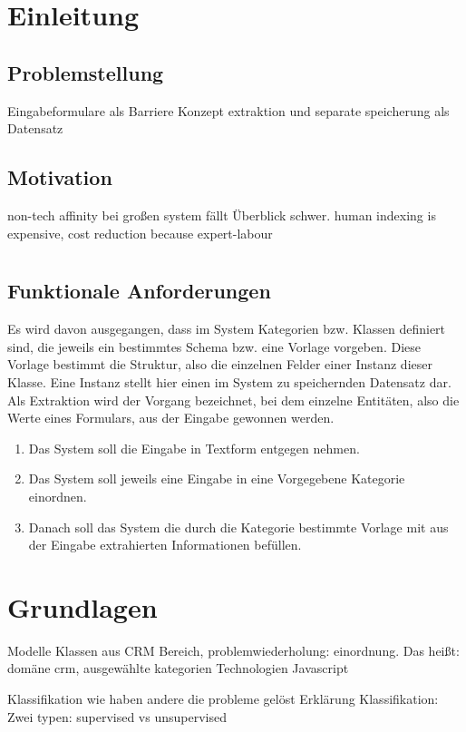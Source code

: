 \chapter{Einleitung}
\section{Problemstellung}
Eingabeformulare als Barriere
Konzept extraktion und separate speicherung als Datensatz
\section{Motivation}
non-tech affinity \cite{hemken}
bei großen system fällt Überblick schwer.
human indexing is expensive, cost reduction because expert-labour \cite{shneiderman}
\chapter{}
\section{Funktionale Anforderungen}
Es wird davon ausgegangen, dass im System Kategorien bzw. Klassen definiert sind, die jeweils ein bestimmtes Schema bzw. eine Vorlage vorgeben. Diese Vorlage bestimmt die Struktur, also die einzelnen Felder einer Instanz dieser Klasse. Eine Instanz stellt hier einen im System zu speichernden Datensatz dar. Als Extraktion wird der Vorgang bezeichnet, bei dem einzelne Entitäten, also die Werte eines Formulars, aus der Eingabe gewonnen werden.
\begin{enumerate}
\item Das System soll die Eingabe in Textform entgegen nehmen.
\item Das System soll jeweils eine Eingabe in eine Vorgegebene Kategorie einordnen.
\item Danach soll das System die durch die Kategorie bestimmte Vorlage mit aus der Eingabe extrahierten Informationen befüllen.
\end{enumerate}


\chapter{Grundlagen}
Modelle
Klassen aus CRM Bereich, problemwiederholung: einordnung. Das heißt:
domäne crm, ausgewählte kategorien
Technologien
Javascript

Klassifikation
wie haben andere die probleme gelöst
Erklärung Klassifikation: Zwei typen: supervised vs unsupervised


